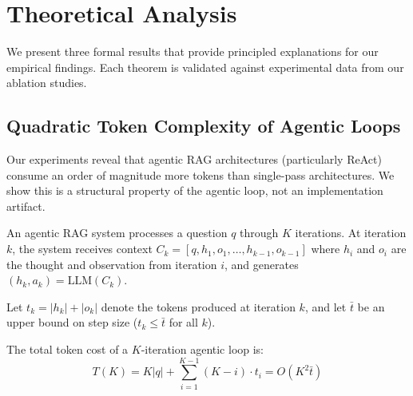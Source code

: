 
\section{Theoretical Analysis}
\label{sec:theory}

We present three formal results that provide principled explanations for our empirical findings. Each theorem is validated against experimental data from our ablation studies.

\subsection{Quadratic Token Complexity of Agentic Loops}
\label{sec:theory:complexity}

Our experiments reveal that agentic RAG architectures (particularly ReAct) consume an order of magnitude more tokens than single-pass architectures. We show this is a structural property of the agentic loop, not an implementation artifact.

\begin{definition}
An agentic RAG system processes a question $q$ through $K$ iterations. At iteration $k$, the system receives context $C_k = [q, h_1, o_1, \ldots, h_{k-1}, o_{k-1}]$ where $h_i$ and $o_i$ are the thought and observation from iteration $i$, and generates $(h_k, a_k) = \mathrm{LLM}(C_k)$.
\end{definition}

Let $t_k = |h_k| + |o_k|$ denote the tokens produced at iteration $k$, and let $\bar{t}$ be an upper bound on step size ($t_k \leq \bar{t}$ for all $k$).

\begin{theorem}
\label{thm:complexity}
The total token cost of a $K$-iteration agentic loop is:
\begin{equation}
T(K) = K|q| + \sum_{i=1}^{K-1}(K-i) \cdot t_i = O(K^2 \bar{t})
\end{equation}
\end{theorem}

